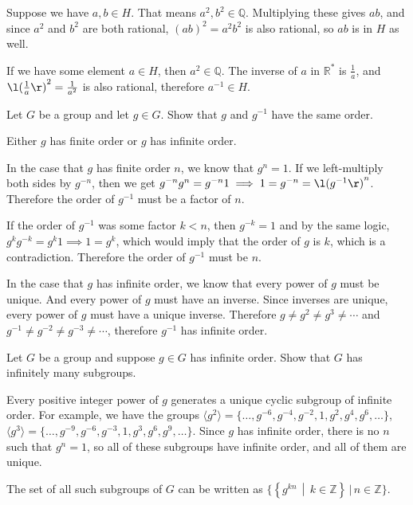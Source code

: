\documentclass[a4paper]{article}
\begin{document}
Suppose we have $a, b \in H$. That means $a^2, b^2 \in \mathbb Q$. Multiplying these gives $ab$, and since $a^2$ and $b^2$ are both rational, ${(ab)}^2 = a^2 b^2$ is also rational, so $ab$ is in $H$ as well.

If we have some element $a \in H$, then $a^2 \in \mathbb Q$. The inverse of $a$ in $\mathbb R^*$ is $\frac1a$, and ${\l(\frac1a\r)}^2 = \frac1{a^2}$ is also rational, therefore $a^{-1} \in H$.


\begin{questionbody}
Let $G$ be a group and let $g \in G$. Show that $g$ and $g^{-1}$ have the same order.
\end{questionbody}

Either $g$ has finite order or $g$ has infinite order.

In the case that $g$ has finite order $n$, we know that $g^n = 1$. If we left-multiply both sides by $g^{-n}$, then we get $g^{-n} g^n = g^{-n} 1 \implies 1 = g^{-n} = {\l(g^{-1}\r)}^n$. Therefore the order of $g^{-1}$ must be a factor of $n$.

If the order of $g^{-1}$ was some factor $k < n$, then $g^{-k} = 1$ and by the same logic, $g^k g^{-k} = g^k 1 \implies 1 = g^k$, which would imply that the order of $g$ is $k$, which is a contradiction. Therefore the order of $g^{-1}$ must be $n$.

In the case that $g$ has infinite order, we know that every power of $g$ must be unique. And every power of $g$ must have an inverse. Since inverses are unique, every power of $g$ must have a unique inverse. Therefore $g \ne g^2 \ne g^3 \ne \cdots$ and $g^{-1} \ne g^{-2} \ne g^{-3} \ne \cdots$, therefore $g^{-1}$ has infinite order.


\begin{questionbody}
Let $G$ be a group and suppose $g \in G$ has infinite order. Show that $G$ has infinitely many subgroups.
\end{questionbody}

Every positive integer power of $g$ generates a unique cyclic subgroup of infinite order. For example, we have the groups $\langle g^2 \rangle = \{\ldots, g^{-6}, g^{-4}, g^{-2}, 1, g^2, g^4, g^6, \ldots\}$, $\langle g^3 \rangle = \{\ldots, g^{-9}, g^{-6}, g^{-3}, 1, g^3, g^6, g^9, \ldots\}$. Since $g$ has infinite order, there is no $n$ such that $g^n = 1$, so all of these subgroups have infinite order, and all of them are unique.

The set of all such subgroups of $G$ can be written as $\Big\{ \left\{g^{kn} \,\middle|\, k \in \mathbb Z\right\} \,\Big|\, n \in \mathbb Z \Big\}$.
\end{document}
